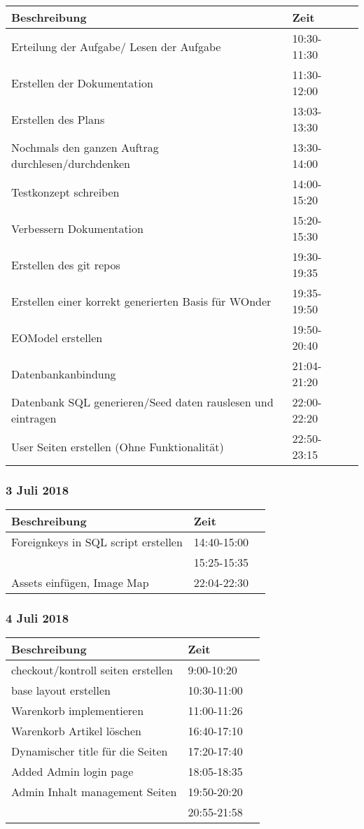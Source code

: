 \documentclass[a4paper, 11pt]{article}
\begin{document}
\begin{tabular}{llr}
\toprule
Beschreibung & Zeit \\
\midrule
Erteilung der Aufgabe/ Lesen der Aufgabe & 10:30-11:30 \\
Erstellen der Dokumentation & 11:30-12:00 \\
Erstellen des Plans & 13:03-13:30 \\
Nochmals den ganzen Auftrag durchlesen/durchdenken & 13:30-14:00 \\
Testkonzept schreiben & 14:00-15:20 \\
Verbessern Dokumentation & 15:20-15:30 \\
Erstellen des git repos & 19:30-19:35 \\
Erstellen einer korrekt generierten Basis  für WOnder & 19:35-19:50 \\
EOModel erstellen & 19:50-20:40 \\
Datenbankanbindung & 21:04-21:20 \\
Datenbank SQL generieren/Seed daten rauslesen und eintragen & 22:00-22:20 \\
User Seiten erstellen (Ohne Funktionalität) & 22:50-23:15 \\
\bottomrule
\end{tabular}

\subsubsection{3 Juli 2018}

\begin{tabular}{llr}
\toprule
Beschreibung & Zeit \\
\midrule
Foreignkeys in SQL script erstellen & 14:40-15:00 \\
 & 15:25-15:35 \\
Assets einfügen, Image Map & 22:04-22:30 \\
\bottomrule
\end{tabular}

\subsubsection{4 Juli 2018}

\begin{tabular}{llr}
\toprule
Beschreibung & Zeit \\
\midrule
checkout/kontroll seiten erstellen & 9:00-10:20 \\
base layout erstellen & 10:30-11:00 \\
Warenkorb implementieren & 11:00-11:26 \\
Warenkorb Artikel löschen & 16:40-17:10 \\
Dynamischer title für die Seiten & 17:20-17:40 \\
Added Admin login page & 18:05-18:35 \\
Admin Inhalt management Seiten & 19:50-20:20 \\
 & 20:55-21:58 \\
\bottomrule
\end{tabular}
\end{document}
